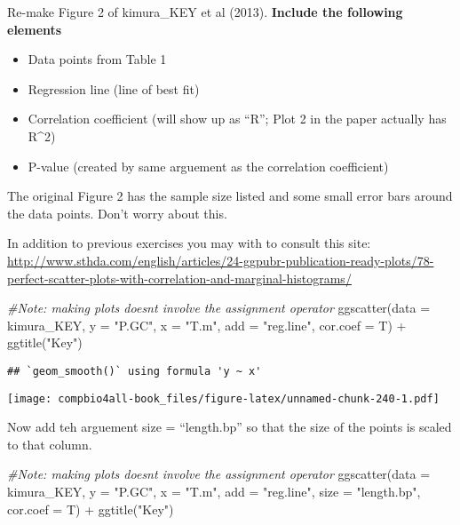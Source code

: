 \documentclass[
]{book}
\newenvironment{Shaded}{\begin{snugshade}}{\end{snugshade}}
\newcommand{\AttributeTok}[1]{\textcolor[rgb]{0.77,0.63,0.00}{#1}}
\newcommand{\CommentTok}[1]{\textcolor[rgb]{0.56,0.35,0.01}{\textit{#1}}}
\newcommand{\FunctionTok}[1]{\textcolor[rgb]{0.00,0.00,0.00}{#1}}
\newcommand{\NormalTok}[1]{#1}
\newcommand{\SpecialCharTok}[1]{\textcolor[rgb]{0.00,0.00,0.00}{#1}}
\newcommand{\StringTok}[1]{\textcolor[rgb]{0.31,0.60,0.02}{#1}}
\providecommand{\tightlist}{%
  \setlength{\itemsep}{0pt}\setlength{\parskip}{0pt}}
\begin{document}
Re-make Figure 2 of kimura\_KEY et al (2013). \textbf{Include the following elements}

\begin{itemize}
\tightlist
\item
  Data points from Table 1
\item
  Regression line (line of best fit)
\item
  Correlation coefficient (will show up as ``R''; Plot 2 in the paper actually has R\^{}2)
\item
  P-value (created by same arguement as the correlation coefficient)
\end{itemize}

The original Figure 2 has the sample size listed and some small error bars around the data points. Don't worry about this.

In addition to previous exercises you may with to consult this site:
\url{http://www.sthda.com/english/articles/24-ggpubr-publication-ready-plots/78-perfect-scatter-plots-with-correlation-and-marginal-histograms/}

\begin{Shaded}
\begin{Highlighting}[]
\CommentTok{\#Note: making plots doesn\textquotesingle{}t involve the assignment operator}
\FunctionTok{ggscatter}\NormalTok{(}\AttributeTok{data =}\NormalTok{ kimura\_KEY,}
         \AttributeTok{y =} \StringTok{"P.GC"}\NormalTok{,}
         \AttributeTok{x =} \StringTok{"T.m"}\NormalTok{,}
         \AttributeTok{add =} \StringTok{"reg.line"}\NormalTok{,}
         \AttributeTok{cor.coef =}\NormalTok{ T) }\SpecialCharTok{+} 
  \FunctionTok{ggtitle}\NormalTok{(}\StringTok{"Key"}\NormalTok{)}
\end{Highlighting}
\end{Shaded}

\begin{verbatim}
## `geom_smooth()` using formula 'y ~ x'
\end{verbatim}

\texttt{[image: compbio4all-book\_files/figure-latex/unnamed-chunk-240-1.pdf]}

Now add teh arguement size = ``length.bp'' so that the size of the points is scaled to that column.

\begin{Shaded}
\begin{Highlighting}[]
\CommentTok{\#Note: making plots doesn\textquotesingle{}t involve the assignment operator}
\FunctionTok{ggscatter}\NormalTok{(}\AttributeTok{data =}\NormalTok{ kimura\_KEY,}
         \AttributeTok{y =} \StringTok{"P.GC"}\NormalTok{,}
         \AttributeTok{x =} \StringTok{"T.m"}\NormalTok{,}
         \AttributeTok{add =} \StringTok{"reg.line"}\NormalTok{,}
         \AttributeTok{size =} \StringTok{"length.bp"}\NormalTok{,}
         \AttributeTok{cor.coef =}\NormalTok{ T) }\SpecialCharTok{+} 
  \FunctionTok{ggtitle}\NormalTok{(}\StringTok{"Key"}\NormalTok{)}
\end{Highlighting}
\end{Shaded}
\end{document}

